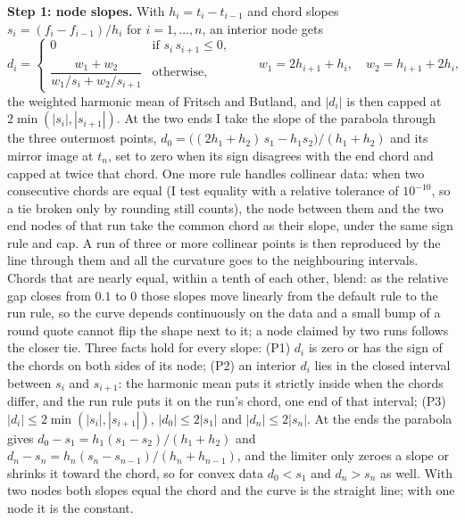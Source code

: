 \documentclass[10pt]{article}
\begin{document}
\textbf{Step 1: node slopes.} With $h_i=t_i-t_{i-1}$ and chord slopes $s_i=(f_i-f_{i-1})/h_i$ for $i=1,\dots,n$, an interior node gets
\[
d_i=\begin{cases}0 & \text{if } s_i\,s_{i+1}\le 0,\\[3pt] \dfrac{w_1+w_2}{w_1/s_i+w_2/s_{i+1}} & \text{otherwise},\end{cases}
\qquad w_1=2h_{i+1}+h_i,\quad w_2=h_{i+1}+2h_i,
\]
the weighted harmonic mean of Fritsch and Butland, and $|d_i|$ is then capped at $2\min(|s_i|,|s_{i+1}|)$. At the two ends I take the
slope of the parabola through the three outermost points, $d_0=\bigl((2h_1+h_2)\,s_1-h_1s_2\bigr)/(h_1+h_2)$ and its mirror image at
$t_n$, set to zero when its sign disagrees with the end chord and capped at twice that chord. One more rule handles collinear data:
when two consecutive chords are equal (I test equality with a relative tolerance of $10^{-10}$, so a tie broken only by rounding still
counts), the node between them and the two end nodes of that run take the common chord as their slope, under the same sign rule and cap.
A run of three or more collinear points is then reproduced by the line through them and all the curvature goes to the neighbouring
intervals. Chords that are nearly equal, within a tenth of each other, blend: as the relative gap closes from $0.1$ to $0$ those
slopes move linearly from the default rule to the run rule, so the curve depends continuously on the data and a small bump of a round
quote cannot flip the shape next to it; a node claimed by two runs follows the closer tie. Three facts hold for every slope: (P1) $d_i$
is zero or has the sign of the chords on both sides of its node; (P2) an interior $d_i$ lies in the closed interval between $s_i$ and
$s_{i+1}$: the harmonic mean puts it strictly inside when the chords differ, and the run rule puts it on the run's chord, one end of
that interval; (P3) $|d_i|\le 2\min(|s_i|,|s_{i+1}|)$, $|d_0|\le 2|s_1|$ and $|d_n|\le 2|s_n|$. At the ends the parabola gives $d_0-s_1=h_1(s_1-s_2)/(h_1+h_2)$ and
$d_n-s_n=h_n(s_n-s_{n-1})/(h_n+h_{n-1})$, and the limiter only zeroes a slope or shrinks it toward the chord, so for convex data
$d_0<s_1$ and $d_n>s_n$ as well. With two nodes both slopes equal the chord and the curve is the straight line; with one node it is
the constant.
\end{document}

